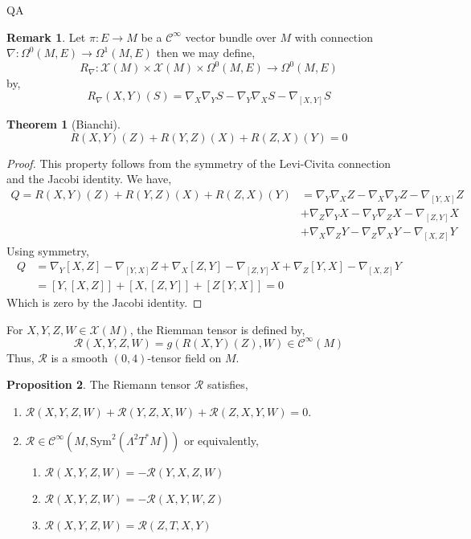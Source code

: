 QA	 \documentclass[12pt]{extarticle}
\theoremstyle{definition}
\newtheorem{theorem}{Theorem}[section]
\newtheorem{proposition}[theorem]{Proposition}
\newtheorem{remark}{Remark}
\newenvironment{definition}[1][Definition:]{\begin{trivlist}
\item[\hskip \labelsep {\bfseries #1}]}{\end{trivlist}}
\newcommand{\C}[1]{\mathcal{C}^{#1}}
\begin{document}
\begin{remark}
Let $\pi : E \to M$ be a $\C{\infty}$ vector bundle over $M$ with connection $\nabla : \Omega^0(M, E) \to \Omega^1(M, E)$ then we may define,
\[ R_{\nabla} : \mathscr{X}(M) \times \mathscr{X}(M) \times \Omega^0(M, E) \to \Omega^0(M, E) \]
by,
\[ R_{\nabla}(X,Y)(S) = \nabla_X \nabla_Y S - \nabla_Y \nabla_X S - \nabla_{[X,Y]} S \]
\end{remark}

\begin{theorem}[Bianchi]
\[ R(X,Y)(Z) + R(Y,Z)(X) + R(Z, X)(Y) = 0 \]
\end{theorem}

\begin{proof}
This property follows from the symmetry of the Levi-Civita connection and the Jacobi identity. We have,
\begin{align*}
Q = R(X,Y)(Z) + R(Y,Z)(X) + R(Z, X)(Y) & = \nabla_Y \nabla_X Z - \nabla_X \nabla_Y Z - \nabla_{[Y,X]} Z
\\
& + \nabla_Z \nabla_Y X - \nabla_Y \nabla_Z X - \nabla_{[Z,Y]} X
\\
& + \nabla_X \nabla_Z Y - \nabla_Z \nabla_X Y - \nabla_{[X,Z]} Y
\end{align*}
Using symmetry,
\begin{align*}
Q & = \nabla_Y [X, Z] - \nabla_{[Y,X]} Z + \nabla_X [Z, Y] - \nabla_{[Z,Y]} X + \nabla_Z [Y, X] - \nabla_{[X,Z]} Y
\\
& = [Y, [X,Z]] + [X, [Z, Y]] + [Z [Y, X]] = 0 
\end{align*}
Which is zero by the Jacobi identity. 
\end{proof}

\newcommand{\Rie}{\mathcal{R}}

\begin{definition}
For $X, Y, Z, W \in \mathscr{X}(M)$, the Riemman tensor is defined by,
\[ \Rie(X, Y, Z, W) = g(R(X, Y)(Z), W) \in \C{\infty}(M) \]
Thus, $\Rie$ is a smooth $(0,4)$-tensor field on $M$.
\end{definition}

\begin{proposition}
The Riemann tensor $\Rie$ satisfies,
\begin{enumerate}
\item $\Rie(X, Y, Z, W) + \Rie(Y, Z, X, W) + \Rie(Z, X, Y, W) = 0$.
\item $\Rie \in \C{\infty}(M, \mathrm{Sym}^2(\Lambda^2 T^* M))$ or equivalently,
\begin{enumerate}
\item $\Rie(X, Y, Z, W) = - \Rie(Y, X, Z, W)$
\item $\Rie(X, Y, Z, W) = - \Rie(X, Y, W, Z)$
\item $\Rie(X, Y, Z, W) = \Rie(Z, T, X, Y)$
\end{enumerate}
\end{enumerate}
\end{proposition}
\end{document}
